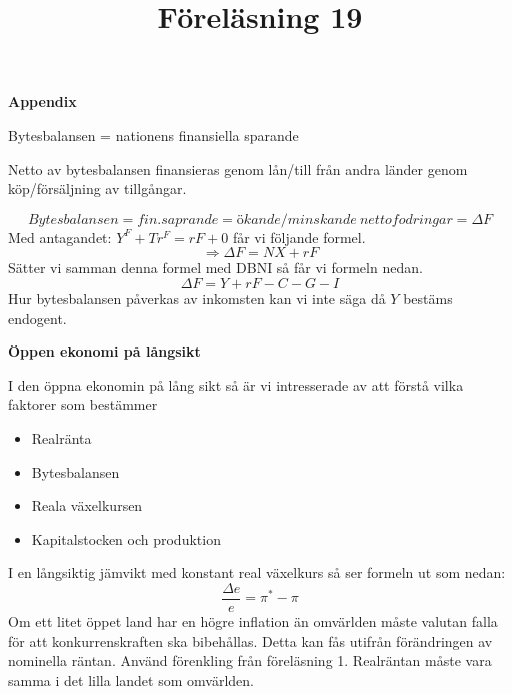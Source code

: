 \documentclass{article}
\begin{document}
\vspace{5mm} \par \noindent

\textbf{Appendix}
\vspace{5mm} \par \noindent
Bytesbalansen = nationens finansiella sparande
\vspace{5mm} \par \noindent

Netto av bytesbalansen finansieras genom lån/till från andra länder genom köp/försäljning av tillgångar. 

$$
Bytesbalansen = fin.saprande = ökande/minskande \ nettofodringar = \Delta F 
$$
Med antagandet: $ Y^F + Tr^F = rF +0$ får vi följande formel. 
$$
\Rightarrow \Delta F = NX + rF 
$$
Sätter vi samman denna formel med DBNI så får vi formeln nedan. 
$$
\Delta F = Y + rF - C - G-I 
$$
Hur  bytesbalansen påverkas av inkomsten kan vi inte säga då $ Y $ bestäms endogent. 

\vspace{5mm} \par \noindent 
\title{Föreläsning 19}
\vspace{5mm} \par \noindent 

\textbf{Öppen ekonomi på långsikt}

\vspace{5mm} \par \noindent 
I den öppna ekonomin på lång sikt så är vi intresserade av att förstå vilka faktorer som bestämmer
\begin{itemize}
     \item Realränta
     \item Bytesbalansen
     \item Reala växelkursen
     \item Kapitalstocken och produktion
\end{itemize}

I en långsiktig jämvikt med konstant real växelkurs så ser formeln ut som nedan: 
$$
\frac{\Delta e}{e} = \pi^* - \pi
$$
Om ett litet öppet land har en högre inflation än omvärlden måste valutan falla för att konkurrenskraften ska bibehållas. Detta kan fås utifrån förändringen av nominella räntan. Använd förenkling från föreläsning 1.  Realräntan måste vara samma i det lilla landet som omvärlden. 

\vspace{5mm} \par \noindent 
\end{document}
